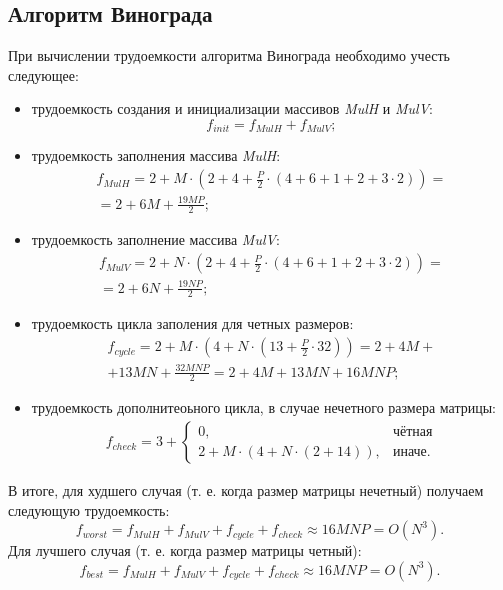 \subsection*{Алгоритм Винограда}
При вычислении трудоемкости алгоритма Винограда необходимо учесть следующее:
\begin{itemize}
	\item трудоемкость создания и инициализации массивов \textit{MulH} и \textit{MulV}:
	\begin{equation}
		f_{init} = f_{MulH} + f_{MulV};
	\end{equation}
	\item трудоемкость заполнения массива \textit{MulH}:
	\begin{equation}
		\begin{gathered}
		f_{MulH} = 2 + M \cdot (2 + 4 + \frac{P}{2} \cdot (4 + 6 + 1 + 2 + 3 \cdot 2)) = \\
		= 2 + 6M + \frac{19MP}{2};
		\end{gathered}
	\end{equation}
	\item трудоемкость заполнение массива \textit{MulV}:
	\begin{equation}
		\begin{gathered}
		f_{MulV} = 2 + N \cdot (2 + 4 + \frac{P}{2} \cdot (4 + 6 + 1 + 2 + 3 \cdot 2)) = \\
		= 2 + 6N + \frac{19NP}{2};
		\end{gathered}
	\end{equation}
	\item трудоемкость цикла заполения для четных размеров:
	\begin{equation}
		\begin{gathered}
			f_{cycle} = 2 + M \cdot (4 + N \cdot (13 + \frac{P}{2} \cdot 32)) = 2 + 4M + \\
			+ 13MN + \frac{32MNP}{2}  = 2 + 4M + 13MN + 16MNP;
		\end{gathered}
	\end{equation}
	\item трудоемкость дополнитеоьного цикла, в случае нечетного размера матрицы:
	\begin{equation}
		\begin{gathered}
			f_{check} = 3 + 
			\begin{cases}
				0, & \text{чётная} \\
				2 + M \cdot (4 + N \cdot (2 + 14)), & \text{иначе}.
			\end{cases}
		\end{gathered}  
	\end{equation}
\end{itemize}
В итоге, для худшего случая (т. е. когда размер матрицы нечетный) получаем следующую трудоемкость:
\begin{equation}
	f_{worst} = f_{MulH} + f_{MulV} + f_{cycle} + f_{check} \approx 16MNP = O(N^3).
\end{equation}
Для лучшего случая (т. е. когда размер матрицы четный):
\begin{equation}
	f_{best} = f_{MulH} + f_{MulV} + f_{cycle} + f_{check} \approx 16MNP = O(N^3).
\end{equation}

